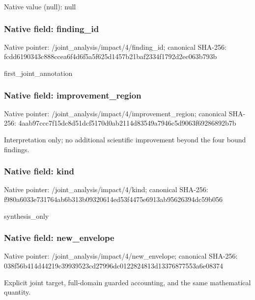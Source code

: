 \documentclass[10pt,a4paper]{article}
\begin{document}
Native value (null): null

\subsubsection{Native field: finding\_\allowbreak{}id}
Native pointer: /joint\_\allowbreak{}analysis/impact/4/finding\_\allowbreak{}id; canonical SHA-256: fcdd6190343c888ccea6f4d6f5a5f625d1457b21baf2334f1792d2ec063b793b

\begingroup\raggedright\sloppy first\_\allowbreak{}joint\_\allowbreak{}annotation\par\endgroup

\subsubsection{Native field: improvement\_\allowbreak{}region}
Native pointer: /joint\_\allowbreak{}analysis/impact/4/improvement\_\allowbreak{}region; canonical SHA-256: 4aab97ccc7f15dc8d51dcf5170d0ab2114d83549a7946c5d9063f69286892b7b

\begingroup\raggedright\sloppy Interpretation only;\allowbreak{} no additional scientific improvement beyond the four bound findings.\par\endgroup

\subsubsection{Native field: kind}
Native pointer: /joint\_\allowbreak{}analysis/impact/4/kind; canonical SHA-256: f980a6033e731764ab6b313b09320614ed53f4475e6913ab95626394dc59b056

\begingroup\raggedright\sloppy synthesis\_\allowbreak{}only\par\endgroup

\subsubsection{Native field: new\_\allowbreak{}envelope}
Native pointer: /joint\_\allowbreak{}analysis/impact/4/new\_\allowbreak{}envelope; canonical SHA-256: 038f56b414d44219c39939523cd27996dc0122824813d13376877553a6e08374

\begingroup\raggedright\sloppy Explicit joint target,\allowbreak{} full-domain guarded accounting,\allowbreak{} and the same mathematical quantity.\par\endgroup
\end{document}
